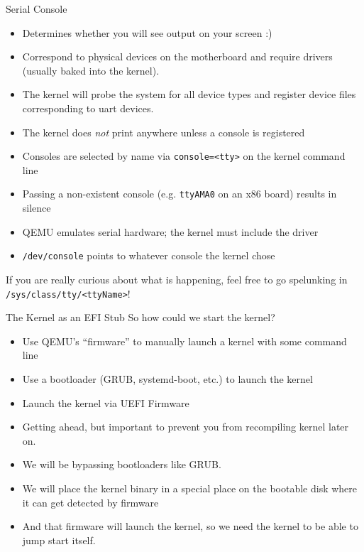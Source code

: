 \documentclass{../lecture}
\begin{document}
\begin{frame}{Serial Console}
  \begin{itemize}
    \item Determines whether you will see output on your screen :)
    \item Correspond to physical devices on the motherboard and require drivers
      (usually baked into the kernel).
    \item The kernel will probe the system for all device types and register
      device files corresponding to uart devices.
    \item The kernel does \emph{not} print anywhere unless a console is registered
    \item Consoles are selected by name via \texttt{console=<tty>} on the kernel command line
    \item Passing a non-existent console (e.g. \texttt{ttyAMA0} on an x86 board)
      results in silence
    \item QEMU emulates serial hardware; the kernel must include the driver
    \item \texttt{/dev/console} points to whatever console the kernel chose
  \end{itemize}
  If you are really curious about what is happening, feel free to go spelunking
  in \texttt{/sys/class/tty/<ttyName>}!
\end{frame}

\begin{frame}{The Kernel as an EFI Stub}
  So how could we start the kernel?
  \begin{itemize}
    \item Use QEMU's ``firmware'' to manually launch a kernel with some command
      line
    \item Use a bootloader (GRUB, systemd-boot, etc.) to launch the kernel
    \item Launch the kernel via UEFI Firmware
  \end{itemize}
  \begin{itemize}
    \item Getting ahead, but important to prevent you from recompiling kernel
      later on.
    \item We will be bypassing bootloaders like GRUB.
    \item We will place the kernel binary in a special place on the
      bootable disk where it can get detected by firmware
    \item And that firmware will launch the kernel, so we need the kernel to be
      able to jump start itself.
  \end{itemize}
\end{frame}
\end{document}
